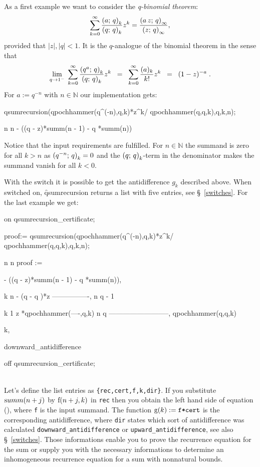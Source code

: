 As a first example we want to consider the \textsl{q-binomial theorem}:
\[
	\sum_{k=0}^\infty{\frac{\left(a;\,q\right)_{k}}{\left(q;\,q\right)_{k}}z^k} =
	\frac{\left(a\,z;\,q\right)_{\infty}}{\left(z;\,q\right)_{\infty}},
\]
provided that $|z|,|q|<1$.
It is the $q$-analogue of the binomial theorem in the sense that
\[
	\lim_{q\rightarrow{}1^-}\;{\sum_{k=0}^\infty{
	\frac{\left(q^a;\,q\right)_{k}}{\left(q;\,q\right)_{k}}z^k}} \;\;=\;\;
	\sum_{k=0}^\infty{\frac{(a)_k}{k!}z^k} \;\;=\;\; (1-z)^{-a}\;.
\]
For $a:=q^{-n}$ with $n\in\mathbb{N}$ our implementation gets:
\begin{redoutput}
\redprompt qsumrecursion(qpochhammer(q^(-n),q,k)*z^k/
   qpochhammer(q,q,k),q,k,n);

      n                     n
 - ((q  - z)*summ(n - 1) - q *summ(n))
\end{redoutput}
%
Notice that the input requirements are fulfilled. For $n\in\mathbb{N}$ the
summand is zero for all $k>n$ as $\left(q^{-n};\,q\right)_{k}=0$ and
the $\left(q;\,q\right)_{k}$-term in the denominator makes the summand
vanish for all $k<0$.

With the switch  it is possible
to get the antidifference $g_k$ described above. When switched
on, \f{qsumrecursion} returns a list with five entries,
see \S~\ref{switches}. For the
last example we get:

\begin{redoutput}
\redprompt on qsumrecursion_certificate;

\redprompt proof:= qsumrecursion(qpochhammer(q^(-n),q,k)*z^k/
    qpochhammer(q,q,k),q,k,n);

                n                     n
proof := { - ((q  - z)*summ(n - 1) - q *summ(n)),

                k    n
            - (q  - q )*z
          ----------------,
                n
               q  - 1

            k              1
           z *qpochhammer(----,q,k)
                            n
                           q
          --------------------------,
              qpochhammer(q,q,k)

          k,

          downward_antidifference}

\redprompt off qsumrecursion_certificate;
\end{redoutput}
%
\\[-2.5ex]\noindent{}
Let's define the list entries as \texttt{\{rec,cert,f,k,dir\}}. If you
substitute ${\mathrm summ}(n+j)$ by ${\mathrm f}(n+j,k)$ in \texttt{rec} then
you obtain the left hand side of equation (),
where \texttt{f} is the input summand. The function
${\mathrm g}(k):=\texttt{f*cert}$ is the corresponding
antidifference, where \texttt{dir} states which sort of antidifference
was calculated \texttt{downward\_antidifference} or
\texttt{upward\_antidifference}, see also \S~\ref{switches}.
Those informations enable you to prove the recurrence equation for
the sum or supply you with the necessary informations to determine
an inhomogeneous recurrence equation for a sum with nonnatural bounds.

